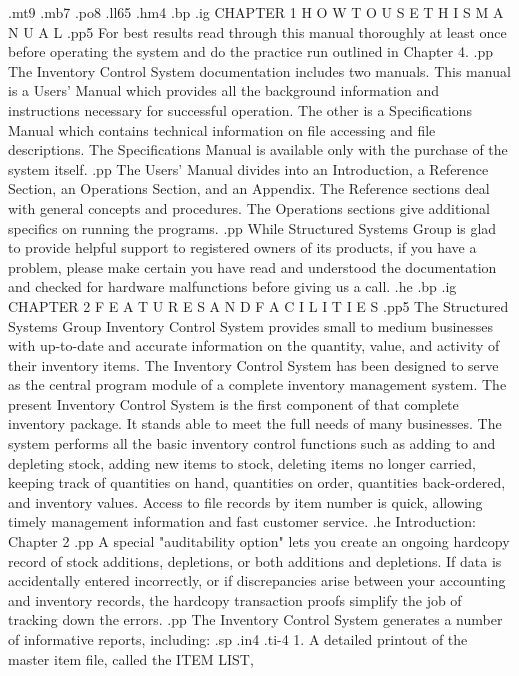 .mt9
.mb7
.po8
.ll65
.hm4
.bp
.ig
CHAPTER 1
H O W	T O   U S E   T H I S	M A N U A L
.pp5
For best results read through this manual thoroughly at least once before
operating the system and do the practice run outlined in Chapter 4.
.pp
The Inventory Control System documentation includes two manuals.  This
manual is a Users' Manual which provides all the background information
and instructions necessary for successful operation.  The other is a
Specifications Manual which contains technical information on file accessing
and file descriptions.	The Specifications Manual is available only
with the purchase of the system itself.
.pp
The Users' Manual divides into an Introduction, a Reference Section, an
Operations Section, and an Appendix.  The Reference sections deal with
general concepts and procedures.  The Operations sections give
additional specifics on running the programs.
.pp
While Structured Systems Group is glad to provide helpful support to
registered owners of its products, if you have a problem, please make certain
you have read and understood the documentation and checked for hardware
malfunctions before giving us a call.
.he
.bp
.ig
CHAPTER 2
F E A T U R E S   A N D   F A C I L I T I E S
.pp5
The Structured Systems Group Inventory Control System provides small
to medium businesses with up-to-date and accurate information on the
quantity, value, and activity of their inventory items.  The Inventory
Control System has been designed to serve as the central program module
of a complete inventory management system.
The present
Inventory Control System is the first component of that complete inventory
package.  It
stands able to meet the full needs of many
businesses.  The system performs all the basic inventory control functions
such as adding to and depleting stock, adding new items to stock,
deleting items no longer carried, keeping track of quantities on hand,
quantities on order, quantities back-ordered, and inventory values.  Access
to file records by item number is quick, allowing timely management information
and fast customer service.
.he Introduction: Chapter 2
.pp
A special "auditability option" lets you create an ongoing hardcopy
record of stock additions, depletions, or both
additions and depletions.
If data is accidentally entered incorrectly, or if discrepancies
arise between your accounting and inventory records, the hardcopy transaction
proofs simplify the job of tracking down the errors.
.pp
The Inventory Control System generates a number of informative reports,
including:
.sp
.in4
.ti-4
1.  A detailed printout of the master item file, called the ITEM LIST,
